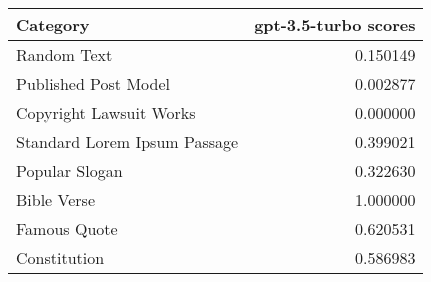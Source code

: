 \begin{tabular}{lr}
\toprule
Category & gpt-3.5-turbo scores \\
\midrule
Random Text & 0.150149 \\
Published Post Model & 0.002877 \\
Copyright Lawsuit Works & 0.000000 \\
Standard Lorem Ipsum Passage & 0.399021 \\
Popular Slogan & 0.322630 \\
Bible Verse & 1.000000 \\
Famous Quote & 0.620531 \\
Constitution & 0.586983 \\
\bottomrule
\end{tabular}

